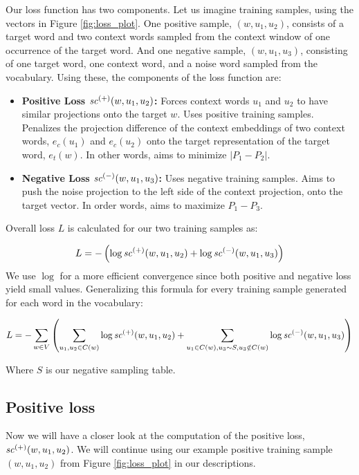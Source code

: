 Our loss function has two components. Let us imagine training samples, using the vectors in Figure \ref{fig:loss_plot}. One positive sample, $(w, u_1, u_2)$, consists of a target word and two context words sampled from the context window of one occurrence of the target word. And one negative sample, $(w, u_1, u_3)$, consisting of one target word, one context word, and a noise word sampled from the vocabulary. Using these, the components of the loss function are:

\begin{itemize}
\item \textbf{Positive Loss $\mathit{sc}^{({+})}({w, u_1, u_2})$:} Forces context words $u_1$ and $u_2$ to have similar projections onto the target $w$. Uses positive training samples. Penalizes the projection difference of the context embeddings of two context words, $e_c(u_1)$ and $e_c(u_2)$ onto the target representation of the target word, $e_t(w)$. In other words, aims to minimize $| P_1 - P_2 |$.
\item \textbf{Negative Loss $\mathit{sc}^{({-})}({w, u_1, u_3})$:} Uses negative training samples. Aims to push the noise projection to the left side of the context projection, onto the target vector. In order words, aims to maximize $P_1 - P_3$.
\end{itemize} 

Overall loss $L$ is calculated for our two training samples as:

\[L = - \left ( \log{\mathit{sc}^{({+})}({w, u_1, u_2})} + \log{\mathit{sc}^{({-})}({w, u_1, u_3})} \right )\]
\noindent
We use $\log$ for a more efficient convergence since both positive and negative loss yield small values. Generalizing this formula for every training sample generated for each word in the vocabulary:

\[L = - \sum_{w \in V} \left (\sum_{u_1, u_2 \in C(w)} \log{\mathit{sc}^{({+})}({w, u_1, u_2})} + \sum_{u_1 \in C(w), u_3 \sim S, u_3 \notin C(w)} \log{\mathit{sc}^{({-})}({w, u_1, u_3})}\right )\]

Where $S$ is our negative sampling table.

\subsection{Positive loss}

Now we will have a closer look at the computation of the positive loss, $\mathit{sc}^{({+})}({w, u_1, u_2})$. We will continue using our example positive training sample $(w, u_1, u_2)$ from Figure \ref{fig:loss_plot} in our descriptions.

